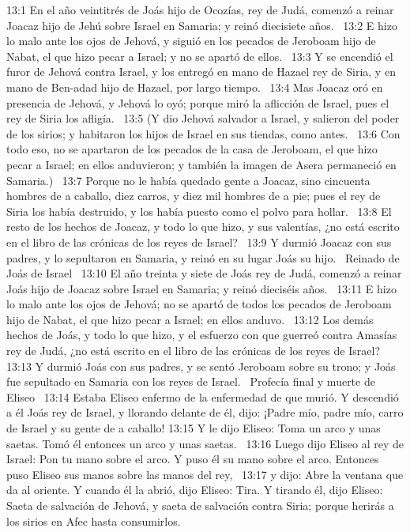 13:1 En el año veintitrés de Joás hijo de Ocozías, rey de Judá, comenzó a reinar Joacaz hijo de Jehú sobre Israel en Samaria; y reinó diecisiete años.  
13:2 E hizo lo malo ante los ojos de Jehová, y siguió en los pecados de Jeroboam hijo de Nabat, el que hizo pecar a Israel; y no se apartó de ellos.  
13:3 Y se encendió el furor de Jehová contra Israel, y los entregó en mano de Hazael rey de Siria, y en mano de Ben-adad hijo de Hazael, por largo tiempo.  
13:4 Mas Joacaz oró en presencia de Jehová, y Jehová lo oyó; porque miró la aflicción de Israel, pues el rey de Siria los afligía.  
13:5 (Y dio Jehová salvador a Israel, y salieron del poder de los sirios; y habitaron los hijos de Israel en sus tiendas, como antes.  
13:6 Con todo eso, no se apartaron de los pecados de la casa de Jeroboam, el que hizo pecar a Israel; en ellos anduvieron; y también la imagen de Asera permaneció en Samaria.)  
13:7 Porque no le había quedado gente a Joacaz, sino cincuenta hombres de a caballo, diez carros, y diez mil hombres de a pie; pues el rey de Siria los había destruido, y los había puesto como el polvo para hollar.  
13:8 El resto de los hechos de Joacaz, y todo lo que hizo, y sus valentías, ¿no está escrito en el libro de las crónicas de los reyes de Israel?  
13:9 Y durmió Joacaz con sus padres, y lo sepultaron en Samaria, y reinó en su lugar Joás su hijo.  
Reinado de Joás de Israel  
13:10 El año treinta y siete de Joás rey de Judá, comenzó a reinar Joás hijo de Joacaz sobre Israel en Samaria; y reinó dieciséis años.  
13:11 E hizo lo malo ante los ojos de Jehová; no se apartó de todos los pecados de Jeroboam hijo de Nabat, el que hizo pecar a Israel; en ellos anduvo.  
13:12 Los demás hechos de Joás, y todo lo que hizo, y el esfuerzo con que guerreó contra Amasías rey de Judá, ¿no está escrito en el libro de las crónicas de los reyes de Israel?  
13:13 Y durmió Joás con sus padres, y se sentó Jeroboam sobre su trono; y Joás fue sepultado en Samaria con los reyes de Israel.  
Profecía final y muerte de Eliseo  
13:14 Estaba Eliseo enfermo de la enfermedad de que murió. Y descendió a él Joás rey de Israel, y llorando delante de él, dijo: ¡Padre mío, padre mío, carro de Israel y su gente de a caballo! 
13:15 Y le dijo Eliseo: Toma un arco y unas saetas. Tomó él entonces un arco y unas saetas.  
13:16 Luego dijo Eliseo al rey de Israel: Pon tu mano sobre el arco. Y puso él su mano sobre el arco. Entonces puso Eliseo sus manos sobre las manos del rey,  
13:17 y dijo: Abre la ventana que da al oriente. Y cuando él la abrió, dijo Eliseo: Tira. Y tirando él, dijo Eliseo: Saeta de salvación de Jehová, y saeta de salvación contra Siria; porque herirás a los sirios en Afec hasta consumirlos.  
